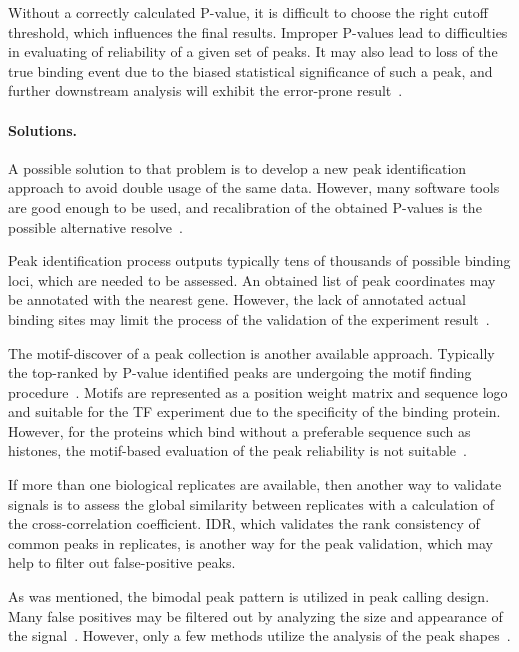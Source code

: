 Without a correctly calculated P-value, it is difficult to choose the right cutoff threshold, which influences the final results. 
Improper P-values lead to difficulties in evaluating of reliability of a given set of peaks.
It may also lead to loss of the true binding event due to the biased statistical significance of such a peak, and further downstream analysis will exhibit the error-prone result~\cite{chitpin2019recap}. 

\paragraph{Solutions.}
A possible solution to that problem is to develop a new peak identification approach to avoid double usage of the same data. 
However, many software tools are good enough to be used, and recalibration of the obtained P-values is the possible alternative resolve~\cite{chitpin2019recap}.


Peak identification process outputs typically tens of thousands of possible binding loci, which are needed to be assessed. 
An obtained list of peak coordinates may be annotated with the nearest gene. 
However, the lack of annotated actual binding sites may limit the process of the validation of the experiment result~\cite{nakato2017recent}.

The motif-discover of a peak collection is another available approach. 
Typically the top-ranked by P-value identified peaks are undergoing the motif finding procedure~\cite{bailey2011dreme}.
Motifs are represented as a position weight matrix and sequence logo and suitable for the TF experiment due to the specificity of the binding protein.
However, for the proteins which bind without a preferable sequence such as histones, the motif-based evaluation of the peak reliability is not suitable~\cite{nakato2017recent}. 

If more than one biological replicates are available, then another way to validate signals is to assess the global similarity between replicates with a calculation of the cross-correlation coefficient. 
IDR, which validates the rank consistency of common peaks in replicates, is another way for the peak validation, which may help to filter out false-positive peaks. 

As  was mentioned, the bimodal peak pattern is utilized in peak calling design. 
Many false positives may be filtered out by analyzing the size and appearance of the signal~\cite{rye2011manually}. 
However, only a few methods utilize the analysis of the peak shapes~\cite{hower2011shape, wu2014polyapeak}.



